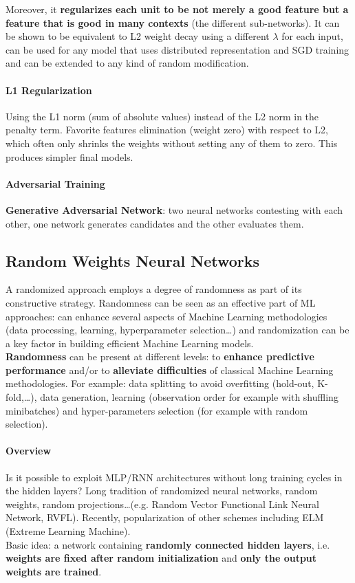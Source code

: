 \documentclass[10pt]{report}
\begin{document}
Moreover, it \textbf{regularizes each unit to be not merely a good feature but a feature that is good in many contexts} (the different sub-networks). It can be shown to be equivalent to L2 weight decay using a different $\lambda$ for each input, can be used for any model that uses distributed representation and SGD training and can be extended to any kind of random modification.
\paragraph{L1 Regularization}
Using the L1 norm (sum of absolute values) instead of the L2 norm in the penalty term. Favorite features elimination (weight zero) with respect to L2, which often only shrinks the weights without setting any of them to zero. This produces simpler final models.
\paragraph{Adversarial Training} \textbf{Generative Adversarial Network}: two neural networks contesting with each other, one network generates candidates and the other evaluates them.
\subsection{Random Weights Neural Networks} A randomized approach employs a degree of randomness as part of its constructive strategy. Randomness can be seen as an effective part of ML approaches: can enhance several aspects of Machine Learning methodologies (data processing, learning, hyperparameter selection\ldots) and randomization can be a key factor in building efficient Machine Learning models.\\
\textbf{Randomness} can be present at different levels: to \textbf{enhance predictive performance} and/or to \textbf{alleviate difficulties} of classical Machine Learning methodologies. For example: data splitting to avoid overfitting (hold-out, K-fold,\ldots), data generation, learning (observation order for example with shuffling minibatches) and hyper-parameters selection (for example with random selection).
\paragraph{Overview} Is it possible to exploit MLP/RNN architectures without long training cycles in the hidden layers? Long tradition of randomized neural networks, random weights, random projections\ldots (e.g. Random Vector Functional Link Neural Network, RVFL). Recently, popularization of other schemes including ELM (Extreme Learning Machine).\\
Basic idea: a network containing \textbf{randomly connected hidden layers}, i.e. \textbf{weights are fixed after random initialization} and \textbf{only the output weights are trained}.
\end{document}
